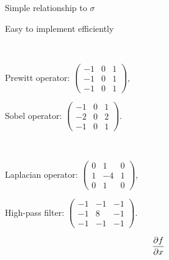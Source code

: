 \begin{compactdesc}
\begin{enumerate*}[label=\protect\circled{\arabic*},itemjoin=]
			\item Simple relationship to $\sigma$\\
			\item Easy to implement efficiently
		\end{enumerate*}
	\item[\lp{Differential filters}]\hfill\\
		\begin{enumerate*}[label=\protect\circled{\arabic*},itemjoin=]
			\item Prewitt operator: $\displaystyle \left(
					\begin{smallmatrix}
						-1&0&1\\
						-1&0&1\\
						-1&0&1
					\end{smallmatrix} \right)$,\\
				\item Sobel operator: $\displaystyle \left(
					\begin{smallmatrix}
						-1&0&1\\
						-2&0&2\\
						-1&0&1
					\end{smallmatrix} \right)$.\\
		\end{enumerate*}
		\item[\lp{High-pass filters}] \hfill\\
			\begin{enumerate*}[label=\protect\circled{\arabic*},itemjoin=]
			\item Laplacian operator: $\displaystyle \left(
					\begin{smallmatrix}
						0&1&0\\
						1&-4&1\\
						0&1&0
					\end{smallmatrix} \right)$,\\
				\item High-pass filter: $\displaystyle \left(
					\begin{smallmatrix}
						-1&-1&-1\\
						-1&8&-1\\
						-1&-1&-1
					\end{smallmatrix} \right)$.\\
			\end{enumerate*}
		\item[\lp{Differentiation and convolution}]
			\begin{align*}
				&\pdv{f}{x}\\

\end{align*}
\end{compactdesc}
